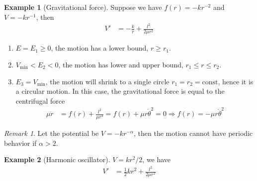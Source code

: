 \documentclass[twoside,9pt]{article}
\numberwithin{equation}{section} %
\newcommand{\lms}{\fontfamily{lmss}\selectfont} %
\theoremstyle{definition}
\newtheorem{example}{\lms Example}[section]
\theoremstyle{remark}
\newtheorem*{remark}{\lms Remark}
\begin{document}
\begin{example}[Gravitational force]
Suppose we have $f(r) = -kr^{-2}$ and $V=-kr^{-1}$, then
\begin{align*}
    V' &= -\frac{k}{r} + \frac{l^2}{2\mu r^2}
\end{align*}
\tikzexternalenable
\begin{figure}[H]
    \centering
\end{figure}
\tikzexternaldisable
\begin{enumerate}[label=\arabic*)]
    \item $E=E_1\geq 0$, the motion has a lower bound, $r\geq r_1$.
    \item $V_\text{min} < E_2 < 0$, the motion has lower and upper bound,
    $r_1\leq r \leq r_2$.
    \item $E_3 = V_\text{min}$, the motion will shrink to a single circle
    $r_1 = r_2 = \text{const}$, hence it is a circular motion.
    In this case, the gravitational force is equal to the centrifugal
    force
    \begin{align*}
        \mu\ddot{r} &= f(r) + \frac{l^2}{\mu r^3}
        = f(r) + \mu r\dot{\theta}^2 = 0
        \Rightarrow
        f(r) = -\mu r\dot{\theta}^2
    \end{align*}
\end{enumerate}
\begin{remark}
Let the potential be $V=-kr^{-\alpha}$,
then the motion cannot have periodic behavior if $\alpha>2$.
\end{remark}
\end{example}

\begin{example}[Harmonic oscillator]
$V=kr^2/2$, we have
\begin{align*}
    V' &= \frac{1}{2}kr^2 + \frac{l^2}{2\mu r^2}
\end{align*}
\end{example}
\end{document}
